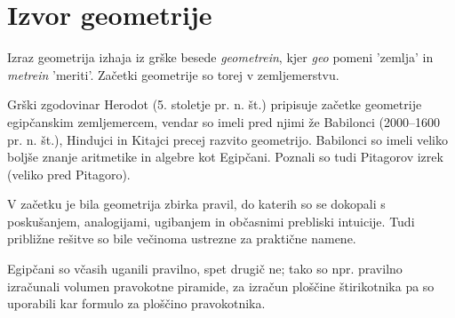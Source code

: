 \chapter{Izvor geometrije}


    Izraz geometrija izhaja iz grške besede \textit{geometrein}, kjer \textit{geo} pomeni 'zemlja' in \textit{metrein} 'meriti'. Začetki geometrije so torej v zemljemerstvu.

    Grški zgodovinar Herodot (5. stoletje pr. n. št.) pripisuje začetke  geometrije egipčanskim zemljemercem, vendar so imeli pred njimi že Babilonci (2000--1600 pr. n.  št.), Hindujci in Kitajci precej razvito geometrijo. Babilonci so imeli veliko boljše znanje aritmetike in algebre kot Egipčani. Poznali so tudi Pitagorov izrek (veliko pred Pitagoro).

    V začetku je bila geometrija zbirka pravil, do katerih so se dokopali s poskušanjem, analogijami, ugibanjem in občasnimi prebliski intuicije. Tudi približne rešitve so bile večinoma ustrezne za praktične namene.

    Egipčani so včasih uganili pravilno, spet drugič ne; tako so npr. pravilno izračunali volumen pravokotne piramide, za izračun ploščine štirikotnika pa so uporabili kar formulo za ploščino pravokotnika.


